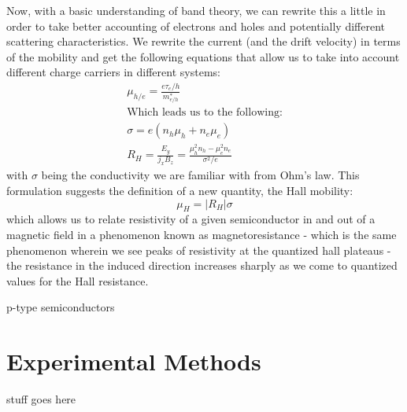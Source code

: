 \documentclass[reprint, nobibnotes, amssymb, amsmath, amsfonts, physics, mathtools, mathrsfs, floatfix]{revtex4-1}
\begin{document}
    Now, with a basic understanding of band theory, we can rewrite this a little in order to take better accounting of electrons and holes and potentially different scattering characteristics.  We rewrite the current (and the drift velocity) in terms of the mobility and get the following equations that allow us to take into account different charge carriers in different systems:
    \begin{gather}
      \mu_{h/e} = \frac{e \tau_e/h}{m_{e/h}^*} \label{mobility} \\
      \text{Which leads us to the following:} \nonumber \\
      \sigma = e(n_h\mu_h + n_e\mu_e) \label{conductivity} \\
      R_H = \frac{E_y}{j_x B_z} = \frac{\mu_h^2 n_h - \mu_e^2 n_e}{\sigma^2/e}
    \end{gather}
    with $\sigma$ being the conductivity we are familiar with from Ohm's law.  This formulation suggests the definition of a new quantity, the Hall mobility:
    \begin{equation}
      \mu_H = |R_H|\sigma \label{hall_mobility}
    \end{equation}
    which allows us to relate resistivity of a given semiconductor in and out of a magnetic field in a phenomenon known as magnetoresistance - which is the same phenomenon wherein we see peaks of resistivity at the quantized hall plateaus - the resistance in the induced direction increases sharply as we come to quantized values for the Hall resistance.

    p-type semiconductors

    \section{Experimental Methods}
    stuff goes here



  
  
\end{document}
